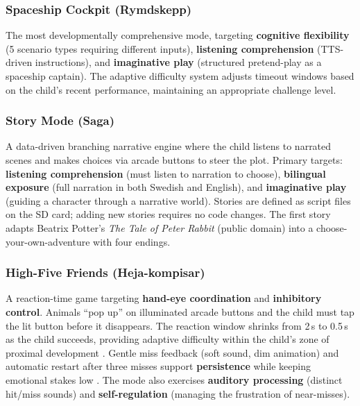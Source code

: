 \documentclass[12pt, a4paper]{article}
\begin{document}
\subsubsection{Spaceship Cockpit (Rymdskepp)}
The most developmentally comprehensive mode, targeting \textbf{cognitive
flexibility} (5 scenario types requiring different inputs),
\textbf{listening comprehension} (TTS-driven instructions), and
\textbf{imaginative play} (structured pretend-play as a spaceship captain).
The adaptive difficulty system adjusts timeout windows based on the child's
recent performance, maintaining an appropriate challenge level.

\subsubsection{Story Mode (Saga)}
A data-driven branching narrative engine where the child listens to narrated
scenes and makes choices via arcade buttons to steer the plot. Primary targets:
\textbf{listening comprehension} (must listen to narration to choose),
\textbf{bilingual exposure} (full narration in both Swedish and English), and
\textbf{imaginative play} (guiding a character through a narrative world).
Stories are defined as script files on the SD card; adding new stories requires
no code changes.  The first story adapts Beatrix Potter's \emph{The Tale of
Peter Rabbit} (public domain) into a choose-your-own-adventure with four endings.

\subsubsection{High-Five Friends (Heja-kompisar)}
A reaction-time game targeting \textbf{hand-eye coordination} and
\textbf{inhibitory control}. Animals ``pop up'' on illuminated arcade buttons
and the child must tap the lit button before it disappears. The reaction window
shrinks from 2\,s to 0.5\,s as the child succeeds, providing adaptive
difficulty within the child's zone of proximal development
\citep{vygotsky1978mind}. Gentle miss feedback (soft sound, dim animation) and
automatic restart after three misses support \textbf{persistence} while keeping
emotional stakes low \citep{dweck2006mindset}. The mode also exercises
\textbf{auditory processing} (distinct hit/miss sounds) and
\textbf{self-regulation} (managing the frustration of near-misses).
\end{document}
